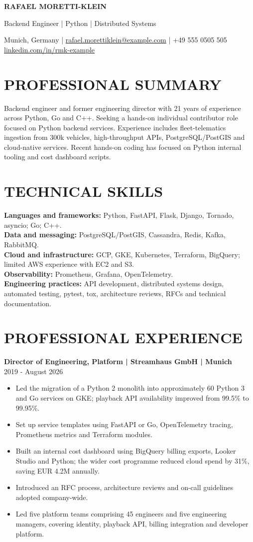 \documentclass[11pt,a4paper]{article}
\newcommand{\cvsection}[1]{\Needspace{4\baselineskip}\section*{#1}}
\newcommand{\cvrole}[2]{\Needspace{6\baselineskip}\noindent\textbf{#1}\\#2\par}
\begin{document}
{\LARGE\bfseries\color{primarycolor} RAFAEL MORETTI-KLEIN}\par
{\large\color{accentcolor} Backend Engineer | Python | Distributed Systems}\par
Munich, Germany | \href{mailto:rafael.morettiklein@example.com}{rafael.morettiklein@example.com} | +49 555 0505 505\\
\href{https://linkedin.com/in/rmk-example}{linkedin.com/in/rmk-example}

\cvsection{PROFESSIONAL SUMMARY}
Backend engineer and former engineering director with 21 years of experience across Python, Go and C++. Seeking a hands-on individual contributor role focused on Python backend services. Experience includes fleet-telematics ingestion from 300k vehicles, high-throughput APIs, PostgreSQL/PostGIS and cloud-native services. Recent hands-on coding has focused on Python internal tooling and cost dashboard scripts.

\cvsection{TECHNICAL SKILLS}
\textbf{Languages and frameworks:} Python, FastAPI, Flask, Django, Tornado, asyncio; Go; C++.\\
\textbf{Data and messaging:} PostgreSQL/PostGIS, Cassandra, Redis, Kafka, RabbitMQ.\\
\textbf{Cloud and infrastructure:} GCP, GKE, Kubernetes, Terraform, BigQuery; limited AWS experience with EC2 and S3.\\
\textbf{Observability:} Prometheus, Grafana, OpenTelemetry.\\
\textbf{Engineering practices:} API development, distributed systems design, automated testing, pytest, tox, architecture reviews, RFCs and technical documentation.

\cvsection{PROFESSIONAL EXPERIENCE}
\cvrole{Director of Engineering, Platform | Streamhaus GmbH | Munich}{2019 - August 2026}
\begin{itemize}
\item Led the migration of a Python 2 monolith into approximately 60 Python 3 and Go services on GKE; playback API availability improved from 99.5\% to 99.95\%.
\item Set up service templates using FastAPI or Go, OpenTelemetry tracing, Prometheus metrics and Terraform modules.
\item Built an internal cost dashboard using BigQuery billing exports, Looker Studio and Python; the wider cost programme reduced cloud spend by 31\%, saving EUR 4.2M annually.
\item Introduced an RFC process, architecture reviews and on-call guidelines adopted company-wide.
\item Led five platform teams comprising 45 engineers and five engineering managers, covering identity, playback API, billing integration and developer platform.
\end{itemize}
\end{document}
